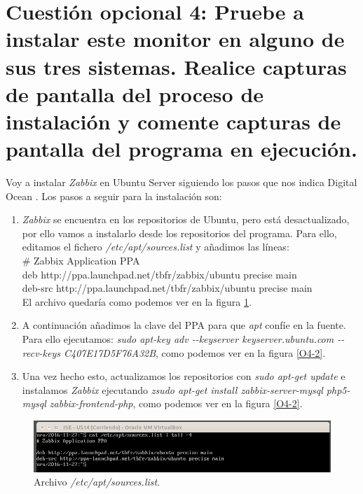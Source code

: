 \documentclass[a4paper,titlepage,12pt]{scrartcl}	%
\numberwithin{figure}{section} %
\numberwithin{table}{section} %
\begin{document}
	\section[Cuestión opcional 4: Pruebe a instalar este monitor en alguno de sus tres sistemas. Realice capturas de pantalla del proceso de instalación y comente capturas de pantalla del programa en ejecución.]{Cuestión opcional 4: Pruebe a instalar este monitor en alguno de sus tres sistemas. Realice capturas de pantalla del proceso de instalación y comente capturas de pantalla del programa en ejecución.}
	
	Voy a instalar \textit{Zabbix} en Ubuntu Server siguiendo los pasos que nos indica Digital Ocean \cite{zabbix}. Los pasos a seguir para la instalación son: \label{pasos_zabbix}
	\begin{enumerate}
		\item \textit{Zabbix} se encuentra en los repositorios de Ubuntu, pero está desactualizado, por ello vamos a instalarlo desde los repositorios del programa. Para ello, editamos el fichero \textit{/etc/apt/sources.list} y añadimos las líneas: \\
		
		\# Zabbix Application PPA \\
		deb http://ppa.launchpad.net/tbfr/zabbix/ubuntu precise main \\
		deb-src http://ppa.launchpad.net/tbfr/zabbix/ubuntu precise main \\
		
		El archivo quedaría como podemos ver en la figura \ref{O4-1}.
		\item A continuación añadimos la clave del PPA para que \textit{apt} confíe en la fuente. Para ello ejecutamos: \textit{sudo apt-key adv -{-}keyserver keyserver.ubuntu.com -{-}recv-keys C407E17D5F76A32B}, como podemos ver en la figura \ref{O4-2}.
		\item Una vez hecho esto, actualizamos los repositorios con \textit{sudo apt-get update} e instalamos \textit{Zabbix} ejecutando \textit{zsudo apt-get install zabbix-server-mysql php5-mysql zabbix-frontend-php}, como podemos ver en la figura \ref{O4-2}.
	\end{enumerate}
	
	\begin{figure}[H]
		\includegraphics[width=\linewidth]{./Imagenes/O4-1.png}
		\vspace{-0.5cm}
		\caption[Archivo \textit{/etc/apt/sources.list}.]{Archivo \textit{/etc/apt/sources.list}.}
		\label{O4-1}
	\end{figure}
	
\end{document}
